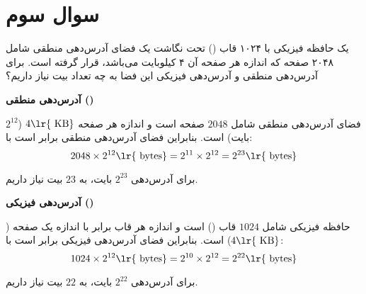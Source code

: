 \section{سوال سوم}


یک حافظه فیزیکی با ۱۰۲۴ قاب () تحت نگاشت یک فضای آدرس‌دهی منطقی شامل ۲۰۴۸ صفحه که اندازه هر صفحه آن ۴ کیلوبایت می‌باشد، قرار گرفته است. برای آدرس‌دهی منطقی و آدرس‌دهی فیزیکی این فضا به چه تعداد بیت نیاز داریم؟

\begin{qsolve}
	
	
	\textbf{آدرس‌دهی منطقی ()}
	
	فضای آدرس‌دهی منطقی شامل \(2048\) صفحه است و اندازه هر صفحه \(4 \text{\lr{ KB}}\) (\(2^{12}\) بایت) است. بنابراین فضای آدرس‌دهی منطقی برابر است با:
	\[
	2048 \times 2^{12} \text{\lr{ bytes}} = 2^{11} \times 2^{12} = 2^{23} \text{\lr{ bytes}}
	\]
	
	برای آدرس‌دهی \(2^{23}\) بایت، به \(23\) بیت نیاز داریم.
	
	
	\textbf{آدرس‌دهی فیزیکی ()}
	
	حافظه فیزیکی شامل \(1024\) قاب () است و اندازه هر قاب برابر با اندازه یک صفحه (\(4 \text{\lr{ KB}}\)) است. بنابراین فضای آدرس‌دهی فیزیکی برابر است با:
	\[
	1024 \times 2^{12} \text{\lr{ bytes}} = 2^{10} \times 2^{12} = 2^{22} \text{\lr{ bytes}}
	\]
	
	برای آدرس‌دهی \(2^{22}\) بایت، به \(22\) بیت نیاز داریم.
	
\end{qsolve}